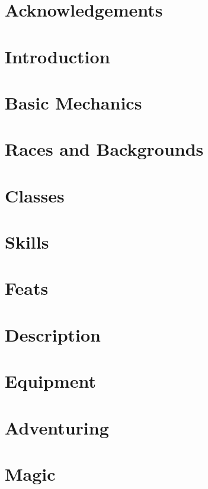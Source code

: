 \documentclass[twocolumn,oneside,letterpaper]{book}
\begin{document}
\setcounter{chapter}{-1}
\tableofcontents
\chapter*{Acknowledgements}


\chapter{Introduction}


\chapter{Basic Mechanics}


\chapter{Races and Backgrounds}


\chapter{Classes}


\chapter{Skills}


\chapter{Feats}


\chapter{Description}


\chapter{Equipment}


\chapter{Adventuring}


\chapter{Magic}

\end{document}

